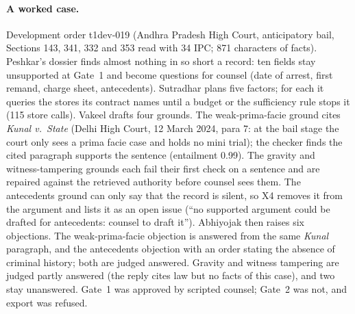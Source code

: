 \paragraph{A worked case.} Development order t1dev-019 (Andhra Pradesh High Court, anticipatory bail, Sections 143, 341, 332 and 353 read with 34 IPC; 871 characters of facts). Peshkar's dossier finds almost nothing in so short a record: ten fields stay unsupported at Gate~1 and become questions for counsel (date of arrest, first remand, charge sheet, antecedents). Sutradhar plans five factors; for each it queries the stores its contract names until a budget or the sufficiency rule stops it (115 store calls). Vakeel drafts four grounds. The weak-prima-facie ground cites \emph{Kunal v.\ State} (Delhi High Court, 12 March 2024, para 7: at the bail stage the court only sees a prima facie case and holds no mini trial); the checker finds the cited paragraph supports the sentence (entailment 0.99). The gravity and witness-tampering grounds each fail their first check on a sentence and are repaired against the retrieved authority before counsel sees them. The antecedents ground can only say that the record is silent, so X4 removes it from the argument and lists it as an open issue (``no supported argument could be drafted for antecedents: counsel to draft it''). Abhiyojak then raises six objections. The weak-prima-facie objection is answered from the same \emph{Kunal} paragraph, and the antecedents objection with an order stating the absence of criminal history; both are judged answered. Gravity and witness tampering are judged partly answered (the reply cites law but no facts of this case), and two stay unanswered. Gate~1 was approved by scripted counsel; Gate~2 was not, and export was refused.

